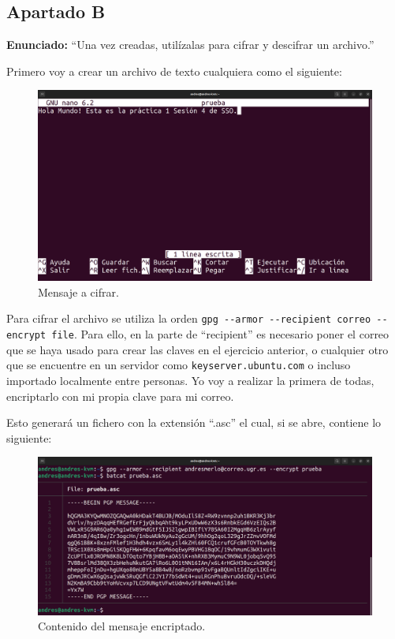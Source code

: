 \documentclass{article}
\begin{document}
\subsection{Apartado B}

\textbf{Enunciado: }``Una vez creadas, utilízalas para cifrar y descifrar un archivo.''

\bigskip

Primero voy a crear un archivo de texto cualquiera como el siguiente:

\begin{figure}[H]
    \includegraphics[width=\textwidth]{imagenes/Captura desde 2022-10-19 16-57-15.png}
    \caption{Mensaje a cifrar.}
\end{figure}

Para cifrar el archivo se utiliza la orden \verb|gpg --armor --recipient correo --encrypt file|. Para ello, en la parte de ``recipient'' es necesario poner el correo que se haya usado para crear las claves en el ejercicio anterior, o cualquier otro que se encuentre en un servidor como \verb|keyserver.ubuntu.com| o incluso importado localmente entre personas. Yo voy a realizar la primera de todas, encriptarlo con mi propia clave para mi correo.

\bigskip

Esto generará un fichero con la extensión ``.asc'' el cual, si se abre, contiene lo siguiente:

\begin{figure}[H]
    \includegraphics[width=\textwidth]{imagenes/Portatil/Captura desde 2022-10-27 18-34-40.png}
    \caption{Contenido del mensaje encriptado.}
\end{figure}
\end{document}
